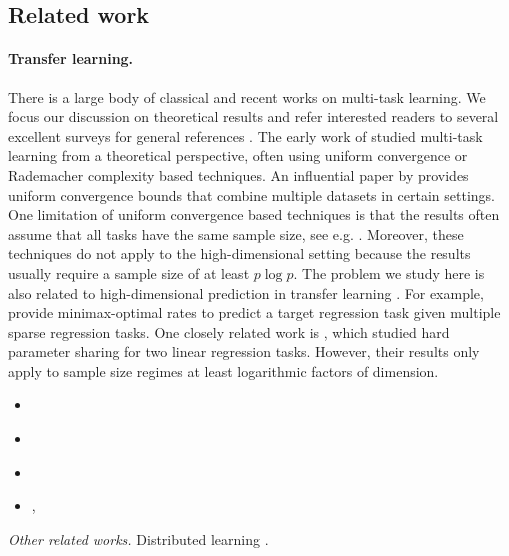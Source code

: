 \subsection{Related work}\label{sec_related}

\paragraph{Transfer learning.}
There is a large body of classical and recent works on multi-task learning.
We focus our discussion on theoretical results and refer interested readers to several excellent surveys for general references \cite{PY09,ZY17,V20}.
The early work of \cite{B00,BS03,M06} studied multi-task learning from a theoretical perspective, often using uniform convergence or Rademacher complexity based techniques.
An influential paper by \cite{BBCK10} provides uniform convergence bounds that combine multiple datasets in certain settings.
One limitation of uniform convergence based techniques is that the results often assume that all  tasks have the same sample size, see e.g. \cite{B00,MPR16}.
Moreover, these techniques do not apply to the high-dimensional setting because the results usually require a sample size of at least $p \log p$.
The problem we study here is also related to high-dimensional prediction in transfer learning \cite{li2020transfer,bastani2020predicting}.
For example, \cite{li2020transfer} provide minimax-optimal rates to predict a target regression task given multiple sparse regression tasks.
\citet{tian2021transfer}
One closely related work is \cite{WZR20}, which studied hard parameter sharing for two linear regression tasks.
However, their results only apply to sample size regimes at least logarithmic factors of dimension.
\begin{itemize}
	\item \citet{lei2021nearoptimal}
	\item \citet{kalan2020minimax}
	\item \citet{cao2019learning}
	\item \citet{hanneke2020value,hanneke2020no}, \citet{cai2021transfer}
\end{itemize}
\textit{Other related works.} Distributed learning \cite{dobriban2018high}.
\citet{chen2021weighted}


